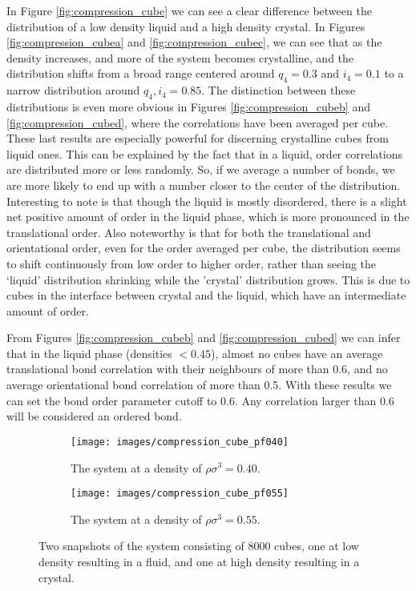 \documentclass[thesis]{subfiles}
\begin{document}
In Figure \ref{fig:compression_cube} we can see a clear difference between the distribution of a low density liquid and a high density crystal. In Figures \ref{fig:compression_cubea} and \ref{fig:compression_cubec}, we can see that as the density increases, and more of the system becomes crystalline, and the distribution shifts from a broad range centered around $q_4 = 0.3$ and $i_4 = 0.1$ to a narrow distribution around $q_4, i_4 = 0.85.$ The distinction between these distributions is even more obvious in Figures \ref{fig:compression_cubeb} and \ref{fig:compression_cubed}, where the correlations have been averaged per cube. These last results are especially powerful for discerning crystalline cubes from liquid ones. This can be explained by the fact that in a liquid, order correlations are distributed more or less randomly. So, if we average a number of bonds, we are more likely to end up with a number closer to the center of the distribution.
Interesting to note is that though the liquid is mostly disordered, there is a slight net positive amount of order in the liquid phase, which is more pronounced in the translational order. Also noteworthy is that for both the translational and orientational order, even for the order averaged per cube, the distribution seems to shift continuously from low order to higher order, rather than seeing the `liquid' distribution shrinking while the 'crystal' distribution grows. This is due to cubes in the interface between crystal and the liquid, which have an intermediate amount of order.

From Figures \ref{fig:compression_cubeb} and \ref{fig:compression_cubed} we can infer that in the liquid phase (densities $< 0.45$), almost no cubes have an average translational bond correlation with their neighbours of more than 0.6, and no average orientational bond correlation of more than 0.5. With these results we can set the bond order parameter cutoff to 0.6. Any correlation larger than 0.6 will be considered an ordered bond.

\begin{figure}[h]
	{\centering
		\hfill
		\begin{subfigure}{0.42\textwidth}
			\centering
			\texttt{[image: images/compression\_cube\_pf040]}
			\caption{The system at a density of $\rho \sigma^3 = 0.40$.}
		\end{subfigure}\hfill
		\begin{subfigure}{0.42\textwidth}
			\centering
			\texttt{[image: images/compression\_cube\_pf055]}
			\caption{The system at a density of $\rho \sigma^3 = 0.55$.}
		\end{subfigure}
		\hfill}
	\caption{Two snapshots of the system consisting of 8000 cubes, one at low density resulting in a fluid, and one at high density resulting in a crystal.}
	\label{fig:compression_cube_snapshots}
\end{figure}
\end{document}
